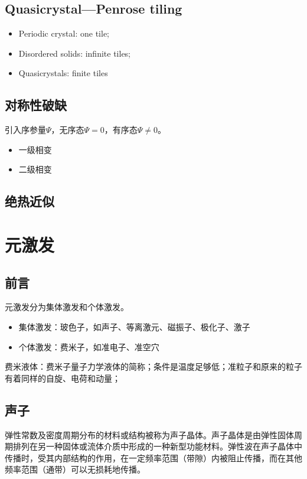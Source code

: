 \documentclass{article}
\begin{document}
\subsection{Quasicrystal---Penrose tiling}

\begin{itemize}
    \item Periodic crystal: one tile;
    \item Disordered solids: infinite tiles;
    \item Quasicrystals: finite tiles
\end{itemize}

\subsection{对称性破缺}

引入序参量$\Psi$，无序态$\Psi=0$，有序态$\Psi\neq 0$。
\begin{itemize}
    \item 一级相变
    \item 二级相变
\end{itemize}

\subsection{绝热近似}

\section{元激发}
\subsection{前言}
元激发分为集体激发和个体激发。
\begin{itemize}
    \item 集体激发：玻色子，如声子、等离激元、磁振子、极化子、激子
    \item 个体激发：费米子，如准电子、准空穴
\end{itemize}

费米液体：费米子量子力学液体的简称；条件是温度足够低；准粒子和原来的粒子有着同样的自旋、电荷和动量；
\subsection{声子}
弹性常数及密度周期分布的材料或结构被称为声子晶体。声子晶体是由弹性固体周期排列在另一种固体或流体介质中形成的一种新型功能材料。弹性波在声子晶体中传播时，受其内部结构的作用，在一定频率范围（带隙）内被阻止传播，而在其他频率范围（通带）可以无损耗地传播。
\end{document}
